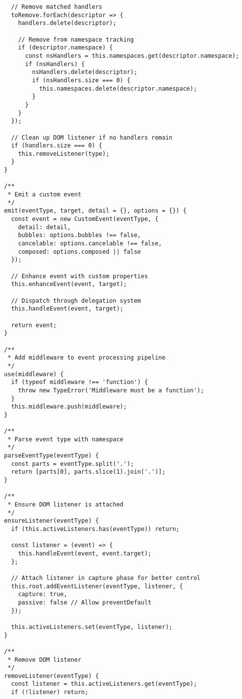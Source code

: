 \documentclass[11pt]{article}
\begin{document}
\begin{verbatim}
    // Remove matched handlers
    toRemove.forEach(descriptor => {
      handlers.delete(descriptor);
      
      // Remove from namespace tracking
      if (descriptor.namespace) {
        const nsHandlers = this.namespaces.get(descriptor.namespace);
        if (nsHandlers) {
          nsHandlers.delete(descriptor);
          if (nsHandlers.size === 0) {
            this.namespaces.delete(descriptor.namespace);
          }
        }
      }
    });
    
    // Clean up DOM listener if no handlers remain
    if (handlers.size === 0) {
      this.removeListener(type);
    }
  }
  
  /**
   * Emit a custom event
   */
  emit(eventType, target, detail = {}, options = {}) {
    const event = new CustomEvent(eventType, {
      detail: detail,
      bubbles: options.bubbles !== false,
      cancelable: options.cancelable !== false,
      composed: options.composed || false
    });
    
    // Enhance event with custom properties
    this.enhanceEvent(event, target);
    
    // Dispatch through delegation system
    this.handleEvent(event, target);
    
    return event;
  }
  
  /**
   * Add middleware to event processing pipeline
   */
  use(middleware) {
    if (typeof middleware !== 'function') {
      throw new TypeError('Middleware must be a function');
    }
    this.middleware.push(middleware);
  }
  
  /**
   * Parse event type with namespace
   */
  parseEventType(eventType) {
    const parts = eventType.split('.');
    return [parts[0], parts.slice(1).join('.')];
  }
  
  /**
   * Ensure DOM listener is attached
   */
  ensureListener(eventType) {
    if (this.activeListeners.has(eventType)) return;
    
    const listener = (event) => {
      this.handleEvent(event, event.target);
    };
    
    // Attach listener in capture phase for better control
    this.root.addEventListener(eventType, listener, {
      capture: true,
      passive: false // Allow preventDefault
    });
    
    this.activeListeners.set(eventType, listener);
  }
  
  /**
   * Remove DOM listener
   */
  removeListener(eventType) {
    const listener = this.activeListeners.get(eventType);
    if (!listener) return;
    

\end{verbatim}
\end{document}
